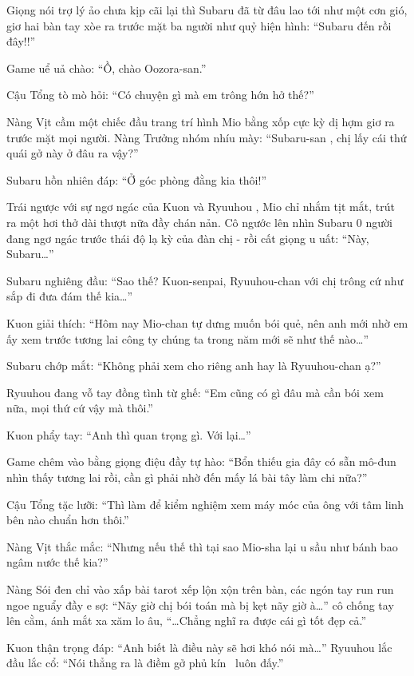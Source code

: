\documentclass[../main.tex]{subfiles}
\begin{document}
Giọng nói trợ lý ảo chưa kịp cãi lại thì Subaru đã từ đâu lao tới như một cơn gió, giơ hai bàn tay xòe ra trước mặt ba người như quỷ hiện hình: ``Subaru đến rồi đây!!''

Game uể uả chào: ``Ồ, chào Oozora-san.''

Cậu Tổng tò mò hỏi: ``Có chuyện gì mà em trông hớn hở thế?''

Nàng Vịt cầm một chiếc đầu trang trí hình Mio bằng xốp cực kỳ dị hợm giơ ra trước mặt mọi người. Nàng Trưởng nhóm nhíu mày: ``Subaru-san , chị lấy cái thứ quái gở này ở đâu ra vậy?''


Subaru hồn nhiên đáp: ``Ở góc phòng đằng kia thôi!''

Trái ngược với sự ngơ ngác của Kuon và Ryuuhou , Mio chỉ nhắm tịt mắt, trút ra một hơi thở dài thượt nữa đầy chán nản. Cô ngước lên nhìn Subaru 0 người đang ngơ ngác trước thái độ lạ kỳ của đàn chị - rồi cất giọng u uất: ``Này, Subaru\dots''

Subaru nghiêng đầu: ``Sao thế? Kuon-senpai, Ryuuhou-chan với chị trông cứ như sắp đi đưa đám thế kia\dots''

Kuon giải thích: ``Hôm nay Mio-chan tự dưng muốn bói quẻ, nên anh mới nhờ em ấy xem trước tương lai công ty chúng ta trong năm mới sẽ như thế nào\dots''

Subaru chớp mắt: ``Không phải xem cho riêng anh hay là Ryuuhou-chan ạ?''

Ryuuhou đang vỗ tay đồng tình từ ghế: ``Em cũng có gì đâu mà cần bói xem nữa, mọi thứ cứ vậy mà thôi.''

Kuon phẩy tay: ``Anh thì quan trọng gì. Với lại\dots''

Game chêm vào bằng giọng điệu đầy tự hào: ``Bổn thiếu gia đây có sẵn mô-đun nhìn thấy tương lai rồi, cần gì phải nhờ đến mấy lá bài tây làm chi nữa?''

Cậu Tổng tặc lưỡi: ``Thì làm để kiểm nghiệm xem máy móc của ông với tâm linh bên nào chuẩn hơn thôi.''

Nàng Vịt thắc mắc: ``Nhưng nếu thế thì tại sao Mio-sha lại u sầu như bánh bao ngâm nước thế kia?''

Nàng Sói đen chỉ vào xấp bài tarot xếp lộn xộn trên bàn, các ngón tay run run ngoe nguẩy đầy e sợ: ``Nãy giờ chị bói toán mà bị kẹt nãy giờ à\dots'' cô chống tay lên cằm, ánh mắt xa xăm lo âu, ``\dots Chẳng nghĩ ra được cái gì tốt đẹp cả.''

Kuon thận trọng đáp: ``Anh biết là điều này sẽ hơi khó nói mà\dots'' Ryuuhou lắc đầu lắc cổ: ``Nói thẳng ra là điềm gở phủ kín \hll\ luôn đấy.''
\end{document}
